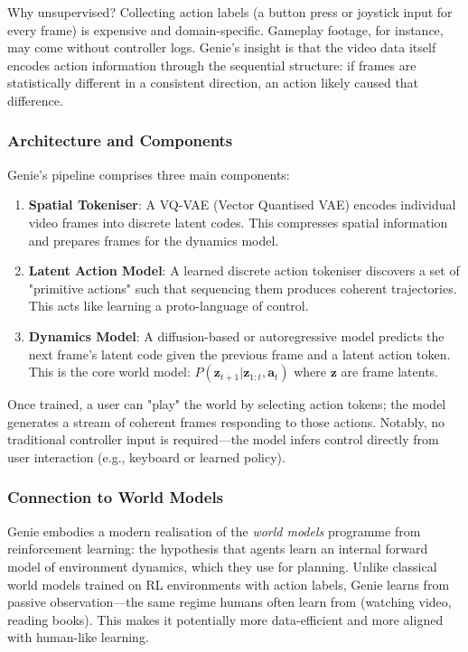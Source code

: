 \begin{intuitionbox}
Why unsupervised? Collecting action labels (a button press or joystick input for every frame) is expensive and domain-specific. Gameplay footage, for instance, may come without controller logs. Genie's insight is that the video data itself encodes action information through the sequential structure: if frames are statistically different in a consistent direction, an action likely caused that difference.
\end{intuitionbox}

\subsubsection{Architecture and Components}

Genie's pipeline comprises three main components:

\begin{enumerate}
  \item \textbf{Spatial Tokeniser}: A VQ-VAE (Vector Quantised VAE) encodes individual video frames into discrete latent codes. This compresses spatial information and prepares frames for the dynamics model.

  \item \textbf{Latent Action Model}: A learned discrete action tokeniser discovers a set of "primitive actions" such that sequencing them produces coherent trajectories. This acts like learning a proto-language of control.

  \item \textbf{Dynamics Model}: A diffusion-based or autoregressive model predicts the next frame's latent code given the previous frame and a latent action token. This is the core world model: $P(\mathbf{z}_{t+1} | \mathbf{z}_{1:t}, \mathbf{a}_t)$ where $\mathbf{z}$ are frame latents.
\end{enumerate}

Once trained, a user can "play" the world by selecting action tokens; the model generates a stream of coherent frames responding to those actions. Notably, no traditional controller input is required—the model infers control directly from user interaction (e.g., keyboard or learned policy).

\subsubsection{Connection to World Models}

Genie embodies a modern realisation of the \emph{world models} programme from reinforcement learning: the hypothesis that agents learn an internal forward model of environment dynamics, which they use for planning. Unlike classical world models trained on RL environments with action labels, Genie learns from passive observation—the same regime humans often learn from (watching video, reading books). This makes it potentially more data-efficient and more aligned with human-like learning.

